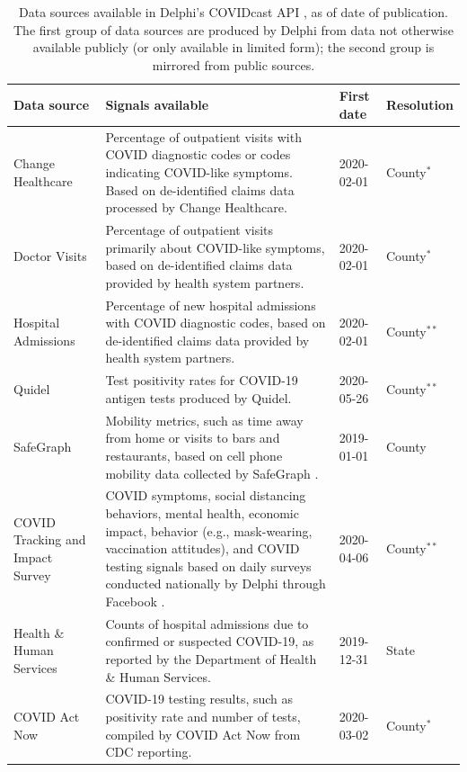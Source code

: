 \documentclass[9pt,twocolumn,twoside,lineno]{pnas-new}
\begin{document}
\begin{table}
\centering
\caption{Data sources available in Delphi's COVIDcast API \cite{CovidcastAPI},
  as of date of publication. The first group of data sources are produced by
  Delphi from data not otherwise available publicly (or only available in
  limited form); the second group is mirrored from public sources.}
\begin{tabular}{>{\raggedright}p{1.2in} p{4.0in} l >{\raggedright\arraybackslash}p{0.5in}}
\toprule
\textbf{Data source} & \textbf{Signals available} & \textbf{First date} &
\textbf{Resolution} \\\midrule
  Change Healthcare & Percentage of outpatient visits with COVID diagnostic codes
or codes indicating COVID-like symptoms. Based on de-identified claims data
processed by Change Healthcare. & 2020-02-01 & County$^*$ \\
  Doctor Visits & Percentage of outpatient visits primarily about COVID-like
symptoms, based on de-identified claims data provided by health system
partners. & 2020-02-01 & County$^*$ \\
  Hospital Admissions & Percentage of new hospital admissions with COVID
diagnostic codes, based on de-identified claims data provided by health system
partners. & 2020-02-01 & County$^{**}$\\
  Quidel & Test positivity rates for COVID-19 antigen tests produced by
Quidel. & 2020-05-26 & County$^{**}$ \\
  SafeGraph & Mobility metrics, such as time away from home or visits to bars
and restaurants, based on cell phone mobility data collected by SafeGraph
\cite{SafeGraphSD, SafeGraphPatterns}. & 2019-01-01 & County \\
 COVID Tracking and Impact Survey & COVID symptoms, social distancing behaviors,
mental health, economic impact, behavior (e.g., mask-wearing, vaccination
attitudes), and COVID testing signals based on daily surveys conducted
nationally by Delphi through Facebook \cite{DelphiSurvey, Kreuter:2020}. &
2020-04-06 & County$^{**}$ \\
  \midrule
  Health \& Human Services & Counts of hospital admissions due to confirmed or
suspected COVID-19, as reported by the Department of Health \& Human Services. &
2019-12-31 & State \\
COVID Act Now & COVID-19 testing results, such as positivity rate and number of
 tests, compiled by COVID Act Now from CDC reporting. & 2020-03-02 & 
County$^*$ \\

\end{tabular}
\end{table}
\end{document}
